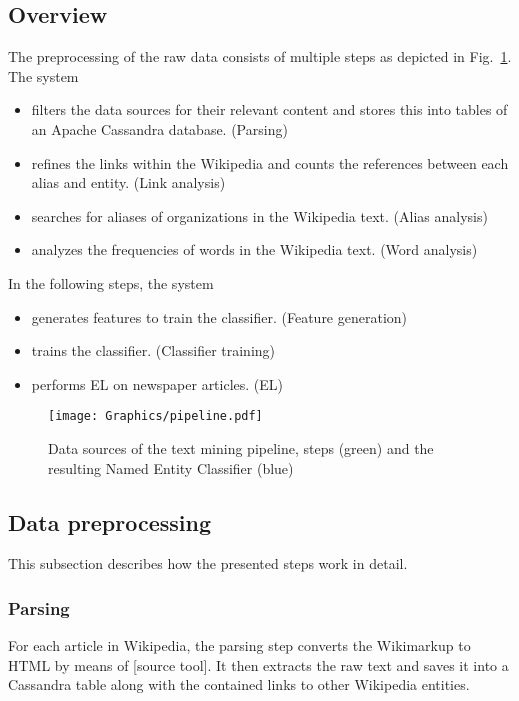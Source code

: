 \subsection{Overview}
The preprocessing of the raw data consists of multiple steps as depicted in Fig.~\ref{fig:job_dependencies}. The system
\begin{itemize}
\item filters the data sources for their relevant content and stores this into tables of an Apache Cassandra database. (Parsing)
\item refines the links within the Wikipedia and counts the references between each alias and entity. (Link analysis)
\item searches for aliases of organizations in the Wikipedia text. (Alias analysis) 
\item analyzes the frequencies of words in the Wikipedia text. (Word analysis)
\end{itemize}

In the following steps, the system
\begin{itemize}
\item generates features to train the classifier. (Feature generation)
\item trains the classifier. (Classifier training)
\item performs EL on newspaper articles. (EL)
\end{itemize}

\begin{figure}[ht]
	\centering
  \texttt{[image: Graphics/pipeline.pdf]}
	\caption{Data sources of the text mining pipeline, steps (green) and the resulting Named Entity Classifier (blue)}
	\label{fig:job_dependencies}
\end{figure}


\subsection{Data preprocessing}
This subsection describes how the presented steps work in detail.

\subsubsection{Parsing}
For each article in Wikipedia, the parsing step converts the Wikimarkup to HTML by means of [source tool]. It then extracts the raw text and saves it into a Cassandra table along with the contained links to other Wikipedia entities.

